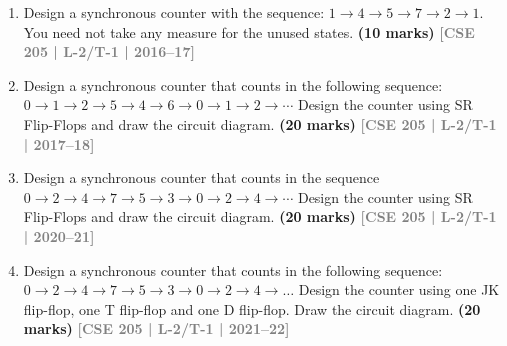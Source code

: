 \documentclass[12pt,a4paper]{article}
\newcommand{\yr}[1]{\hfill\textcolor{gray}{\small\textbf{[#1]}}}
\newcommand{\mk}[1]{\textcolor{orange!70!black}{\small\textbf{(#1 marks)}}}
\begin{document}
\begin{enumerate}
\begin{center}
\end{center}

\mk{12} \yr{CSE 205 | L-2/T-1 | 2015--16}


\item Design a synchronous counter with the sequence: $1 \to 4 \to 5 \to 7 \to 2 \to 1$. You need not take any measure for the unused states.
\mk{10} \yr{CSE 205 | L-2/T-1 | 2016--17}

\item Design a synchronous counter that counts in the following sequence: $0 \to 1 \to 2 \to 5 \to 4 \to 6 \to 0 \to 1 \to 2 \to \cdots$ Design the counter using SR Flip-Flops and draw the circuit diagram.
\mk{20} \yr{CSE 205 | L-2/T-1 | 2017--18}

\item Design a synchronous counter that counts in the sequence $0 \to 2 \to 4 \to 7 \to 5 \to 3 \to 0 \to 2 \to 4 \to \cdots$ Design the counter using SR Flip-Flops and draw the circuit diagram.
\mk{20} \yr{CSE 205 | L-2/T-1 | 2020--21}

\item Design a synchronous counter that counts in the following sequence: $0 \to 2 \to 4 \to 7 \to 5 \to 3 \to 0 \to 2 \to 4 \to \ldots$ Design the counter using one JK flip-flop, one T flip-flop and one D flip-flop. Draw the circuit diagram.
\mk{20} \yr{CSE 205 | L-2/T-1 | 2021--22}


\end{enumerate}
\end{document}
